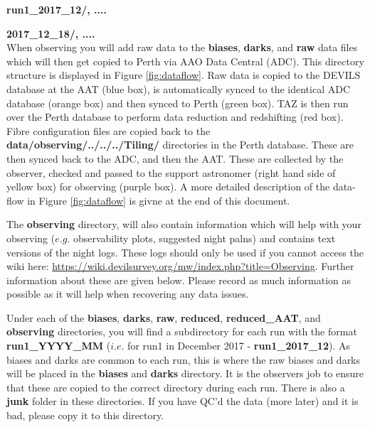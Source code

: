 \documentclass[12pt]{article}
\begin{document}
\hspace{15mm} \textbf{run1\_2017\_12/, ....} 
\vspace{1mm}

\hspace{20mm} \textbf{2017\_12\_18/, ....} \\



When observing you will add raw data to the \textbf{biases},  \textbf{darks}, and \textbf{raw} data files which will then get copied to Perth via AAO Data Central (ADC). This directory structure is displayed in Figure \ref{fig:dataflow}. Raw data is copied to the DEVILS database at the AAT (blue box), is automatically synced to the identical ADC database (orange box) and then synced to Perth (green box). TAZ is then run over the Perth database to perform data reduction and redshifting (red box). Fibre configuration files are copied back to the \textbf{data/observing/../../../Tiling/}  directories in the Perth database. These are then synced back to the ADC, and then the AAT. These are collected by the observer, checked and passed to the support astronomer (right hand side of yellow box) for observing (purple box). A more detailed description of the data-flow in Figure \ref{fig:dataflow} is givne at the end of this document.   

\vspace{2mm}

The \textbf{observing} directory, will also contain information which will help with your observing ($e.g.$ observability plots, suggested night palns) and contains text versions of the night logs. These logs should only be used if you cannot access the wiki here:  \url{https://wiki.devilsurvey.org/mw/index.php?title=Observing}. Further information about these are given below. Please record as much information as possible as it will help when recovering any data issues. 

Under each of the \textbf{biases}, \textbf{darks}, \textbf{raw}, \textbf{reduced}, \textbf{reduced\_AAT},  and \textbf{observing} directories, you will find a subdirectory for each run with the format \textbf{run1\_YYYY\_MM} ($i.e.$ for run1 in December 2017 - \textbf{run1\_2017\_12}). As biases and darks are common to each run, this is where the raw biases and darks will be placed in the \textbf{biases} and \textbf{darks} directory. It is the observers job to ensure that these are copied to the correct directory during each run. There is also a \textbf{junk} folder in these directories. If you have QC'd the data (more later) and it is bad, please copy it to this directory. 
\end{document}
